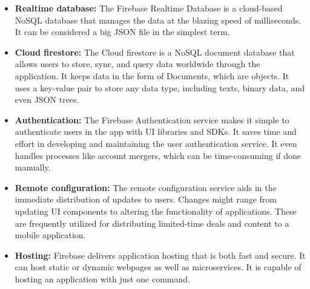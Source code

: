 \begin{itemize}
	\item \textbf{Realtime database:} The Firebase Realtime Database is a cloud-based NoSQL database that manages the data at the blazing speed of milliseconds. It can be considered a big JSON file in the simplest term.
 \item \textbf{Cloud firestore:} The Cloud firestore is a NoSQL document database that allows users to store, sync, and query data worldwide through the application. It keeps data in the form of Documents, which are objects. It uses a key-value pair to store any data type, including texts, binary data, and even JSON trees.
 \item \textbf{Authentication:} The Firebase Authentication service makes it simple to authenticate users in the app with UI libraries and SDKs. It saves time and effort in developing and maintaining the user authentication service. It even handles processes like account mergers, which can be time-consuming if done manually.
 \item \textbf{Remote configuration:} The remote configuration service aids in the immediate distribution of updates to users. Changes might range from updating UI components to altering the functionality of applications. These are frequently utilized for distributing limited-time deals and content to a mobile application.
 \item \textbf{Hosting:} Firebase delivers application hosting that is both fast and secure. It can host static or dynamic webpages as well as microservices. It is capable of hosting an application with just one command.
\end{itemize}
